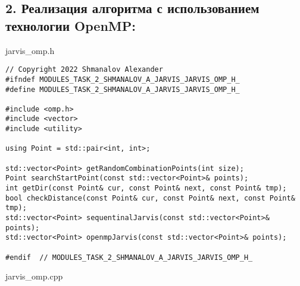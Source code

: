 \documentclass{report}
\begin{document}
\subsection*{2. Реализация алгоритма с использованием технологии OpenMP:}
\par jarvis\_omp.h
\begin{lstlisting}
// Copyright 2022 Shmanalov Alexander
#ifndef MODULES_TASK_2_SHMANALOV_A_JARVIS_JARVIS_OMP_H_
#define MODULES_TASK_2_SHMANALOV_A_JARVIS_JARVIS_OMP_H_

#include <omp.h>
#include <vector>
#include <utility>

using Point = std::pair<int, int>;

std::vector<Point> getRandomCombinationPoints(int size);
Point searchStartPoint(const std::vector<Point>& points);
int getDir(const Point& cur, const Point& next, const Point& tmp);
bool checkDistance(const Point& cur, const Point& next, const Point& tmp);
std::vector<Point> sequentinalJarvis(const std::vector<Point>& points);
std::vector<Point> openmpJarvis(const std::vector<Point>& points);

#endif  // MODULES_TASK_2_SHMANALOV_A_JARVIS_JARVIS_OMP_H_
\end{lstlisting}
\par jarvis\_omp.cpp
\end{document}
